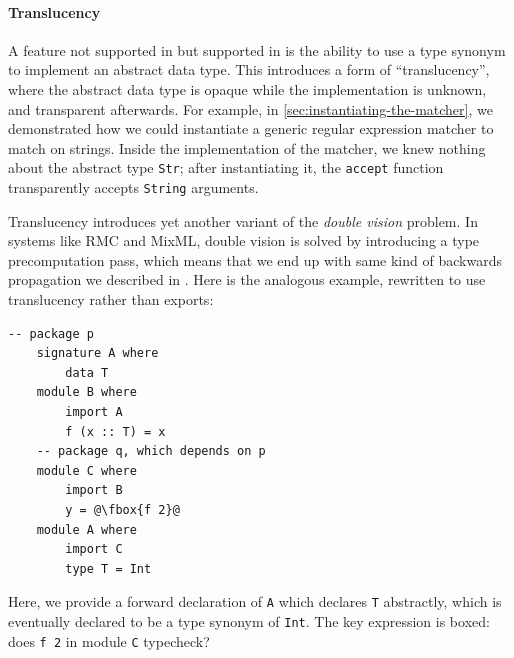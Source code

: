 


\paragraph{Translucency}  A feature not supported in \OldBackpack{}
but supported in \Backpack{} is
the ability to use a type synonym to implement an abstract data type.
This introduces a form of ``translucency'', where the abstract data type
is opaque while the implementation is unknown, and transparent afterwards.
For example, in \cref{sec:instantiating-the-matcher}, we demonstrated
how we could instantiate a generic regular expression matcher to match on strings.
Inside the implementation of the matcher, we knew nothing about the abstract
type \verb|Str|; after instantiating it, the \verb|accept| function
transparently accepts \verb|String| arguments.

Translucency introduces yet another variant of the \emph{double vision}
problem.  In systems like RMC and MixML, double vision is solved by
introducing a type precomputation pass, which means that we end up
with same kind of backwards propagation we described in \OldBackpack{}.
Here is the analogous example, rewritten to use translucency rather than
exports:

\begin{lstlisting}[escapechar=@]
    -- package p
    signature A where
        data T
    module B where
        import A
        f (x :: T) = x
    -- package q, which depends on p
    module C where
        import B
        y = @\fbox{f 2}@
    module A where
        import C
        type T = Int
\end{lstlisting}
%
Here, we provide a forward declaration of \verb|A| which
declares \verb|T| abstractly, which is eventually declared to be
a type synonym of \verb|Int|.  The key expression is boxed: does \verb|f 2|
in module \verb|C| typecheck?

